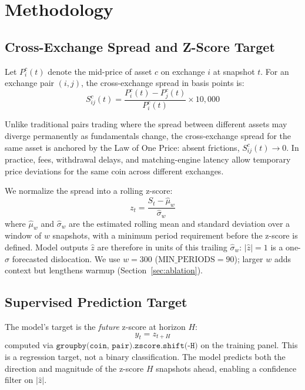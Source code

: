 \section{Methodology}\label{sec:method}

\subsection{Cross-Exchange Spread and Z-Score Target}

Let $P_i^c(t)$ denote the mid-price of asset $c$ on exchange $i$ at snapshot $t$. For an exchange pair $(i, j)$, the cross-exchange spread in basis points is:
\begin{equation}
    S_{ij}^c(t) = \frac{P_i^c(t) - P_j^c(t)}{P_i^c(t)} \times 10{,}000
\end{equation}

Unlike traditional pairs trading where the spread between different assets may diverge permanently as fundamentals change, the cross-exchange spread for the same asset is anchored by the Law of One Price: absent frictions, $S_{ij}^c(t) \to 0$. In practice, fees, withdrawal delays, and matching-engine latency allow temporary price deviations for the same coin across different exchanges.

We normalize the spread into a rolling z-score:
\begin{equation}
    z_t = \frac{S_t - \hat{\mu}_w}{\hat{\sigma}_w}
\end{equation}
where $\hat{\mu}_w$ and $\hat{\sigma}_w$ are the estimated rolling mean and standard deviation over a window of $w$ snapshots, with a minimum period requirement before the z-score is defined. Model outputs $\hat{z}$ are therefore in units of this trailing $\hat{\sigma}_w$: $|\hat{z}|=1$ is a one-$\sigma$ forecasted dislocation. We use $w=300$ ($\text{MIN\_PERIODS}=90$); larger $w$ adds context but lengthens warmup (Section~\ref{sec:ablation}).

\subsection{Supervised Prediction Target}

The model's target is the \emph{future} z-score at horizon $H$:
\begin{equation}
    y_t = z_{t+H}
\end{equation}
computed via $\texttt{groupby(coin, pair).zscore.shift(-H)}$ on the training panel. This is a regression target, not a binary classification. The model predicts both the direction and magnitude of the z-score $H$ snapshots ahead, enabling a confidence filter on $|\hat{z}|$.

